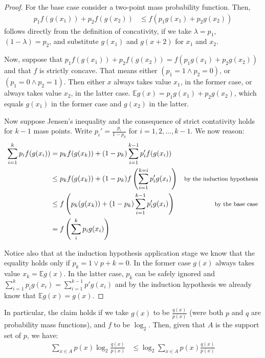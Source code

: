 \documentclass[
  letterpaper,
  DIV=11,
  numbers=noendperiod]{scrartcl}
\begin{document}
\begin{proof}
For the base case consider a two-point mass probability function. Then,
\begin{align*}
p_1f(g(x_1))+ p_2f(g(x_2)) &\leq f(p_1g(x_1) + p_2g(x_2))
\end{align*}
\noindent follows directly from the definition of concativity, if we take $\lambda = p_1$, $(1-\lambda)=p_2$,
 and substitute $g(x_1)$ and $g(x+2)$ for $x_1$ and $x_2$.



Now, suppose that  $ p_1f(g(x_1))+ p_2f(g(x_2)) = f(p_1g(x_1) + p_2g(x_2))$ and that   $f$ is strictly concave.
 That means either $(p_1 = 1\wedge p_2 = 0)$, or $(p_1 = 0 \wedge p_2 =1)$. Then either $x$ always takes
  value $x_1$, in the former case, or always takes value $x_2$, in the latter
   case. $\mathbb{E} g (x) =  p_1 g(x_1) + p_2 g(x_2)$, which equals  $g(x_1)$ in the former case and $g(x_2)$ in the latter.


Now suppose Jensen's inequality and the consequence of strict contativity holds for $k-1$ mass points. 
Write $p_i' = \frac{p_i}{1-p_k}$ for $i = 1, 2, \dots, k-1$. We now reason:
\begin{align*}
\sum_{i=1}^k p_i f(g(x_i)) & =
 p_kf(g(x_k)) + (1-p_k)\sum_{i =1}^{k-1}p_i'f(g(x_i)) &\\
 & \leq p_k f(g(x_k)) + (1-p_k)f\left( \sum_{i = 1}^{k=i}p_i' g(x_i) \right) & \mbox{\footnotesize by 
 the induction hypothesis}\\ &\leq f\left( p_k(g(x_k)) + (1-p_k)\sum_{i = 1}^{k-1} p_i' g(x_i)\right) & 
 \mbox{\footnotesize by the base case} \\
 & = f \left( \sum_{i}^k p_i g(x_i)\right)
 \end{align*}

Notice also that at the induction hypothesis application stage we know that the equality holds only if 
$p_k =1 \vee p+k = 0$. In the former case $g(x)$ always takes value $x_k = \mathbb{E} g(x)$. In the latter case,
 $p_k$ can be safely ignored and $\sum_{i=1}^{k}p_ig(x_i) = \sum_{i=1}^{k-1}p'g(x_i)$ and by the induction 
 hypothesis we already know that $\mathbb{E} g(x) = g(x)$.


\end{proof}

In particular, the claim holds if we take \(g(x)\) to be
\(\frac{q(x)}{p(x)}\) (were both \(p\) and \(q\) are probability mass
functions), and \(f\) to be \(\log_2\). Then, given that \(A\) is the
support set of \(p\), we have: \begin{align*}
\sum_{x\in A}p(x) \log_2 \frac{q(x)}{p(x)} & \leq \log_2 \sum_{x\in A}p(x)\frac{q(x)}{p(x)}
\end{align*}
\end{document}
